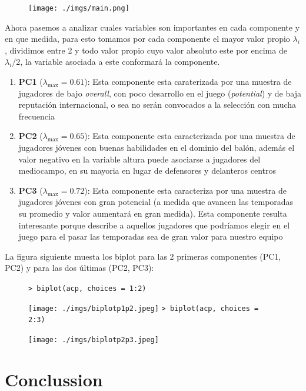 \documentclass[a4paper,10pt,twocolumn]{article}
\begin{document}
\begin{figure}[h]
	\texttt{[image: ./imgs/main.png]}
\end{figure}


Ahora pasemos a analizar cuales variables son importantes en cada componente y en que medida, para esto tomamos por cada componente el mayor valor propio $\lambda_i$, dividimos entre 2 y todo valor propio cuyo valor absoluto este por encima de $\lambda_i / 2$, la variable asociada a este conformar\'a la componente.

\begin{enumerate}
	\item[] \textbf{PC1} ($\lambda_{\max} = 0.61$): Esta componente esta caraterizada por una muestra de jugadores de bajo \textit{overall}, con poco desarrollo en el juego (\textit{potential}) y de baja reputaci\'on internacional, o sea no ser\'an convocados a la selecci\'on con mucha frecuencia
	
	\item[] \textbf{PC2} ($\lambda_{\max} = 0.65$): Esta componente esta caracterizada por una muestra de
	jugadores j\'ovenes con buenas habilidades en el dominio del bal\'on, adem\'as el valor negativo en la variable altura puede asociarse a jugadores del mediocampo, en su mayoria en lugar de defensores y delanteros centros
	
	\item[] \textbf{PC3} ($\lambda_{\max} = 0.72$): Esta componente esta caracteriza por una muestra de 
	jugadores j\'ovenes con gran potencial (a medida que avancen las temporadas su promedio y valor aumentar\'a en gran medida). Esta componente resulta interesante porque describe a aquellos jugadores que podr\'iamos elegir en el juego para el pasar las temporadas sea de gran valor para nuestro equipo 
\end{enumerate} 

La figura siguiente muesta los biplot para las 2 primeras componentes (PC1, PC2) y para las dos \'ultimas (PC2, PC3):

\begin{figure}[h]
	\verb|> biplot(acp, choices = 1:2)|
	
	\texttt{[image: ./imgs/biplotp1p2.jpeg]}
	\verb|> biplot(acp, choices = 2:3)|
	
	\texttt{[image: ./imgs/biplotp2p3.jpeg]}
\end{figure}

\section*{Conclussion}\label{sec:con}

\lipsum[9-11]

\begin{thebibliography}{9}
	
\end{thebibliography}

\label{end}
\end{document}
